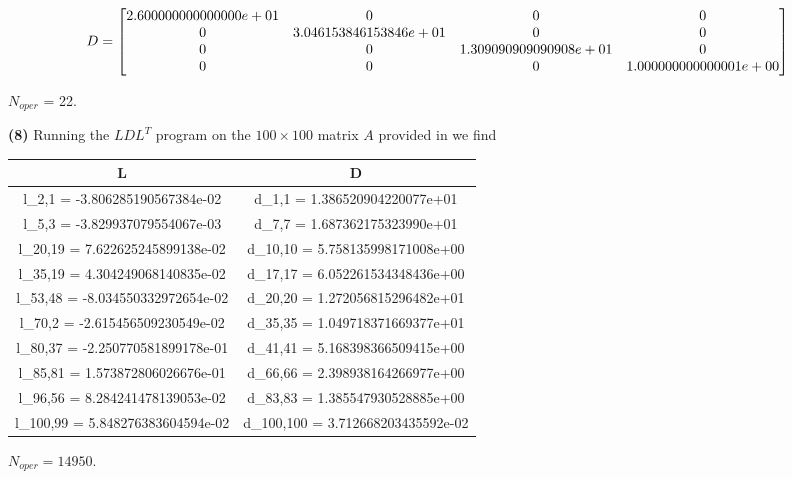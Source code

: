 \documentclass[final,12pt,reqno]{amsart}
\begin{document}
\[
D =
\left[\begin{array}{@{}*{4}{c}@{}}
  2.600000000000000e+01 & 0 & 0 & 0\\
	0 & 3.046153846153846e+01 & 0 & 0\\
	0 & 0 & 1.309090909090908e+01 & 0\\
	0 & 0 & 0 & 1.000000000000001e+00
  \end{array} \right]
\]

$N_{oper}$ = 22.

\newpage

\textbf{(8)} Running the $LDL^T$ program on the $100 \times 100$ matrix $A$ provided in  we find

\begin{center}
	\begin{tabular}{|c|c|}
		\hline
		L & D\\
		\hline
		l_{2,1} = -3.806285190567384e-02 & d_{1,1} = 1.386520904220077e+01\\
		\hline
		l_{5,3} = -3.829937079554067e-03 & d_{7,7} = 1.687362175323990e+01\\
		\hline
		l_{20,19} = 7.622625245899138e-02 & d_{10,10} = 5.758135998171008e+00\\
		\hline
		l_{35,19} = 4.304249068140835e-02 & d_{17,17} = 6.052261534348436e+00\\
		\hline
		l_{53,48} = -8.034550332972654e-02 & d_{20,20} = 1.272056815296482e+01\\
		\hline
		l_{70,2} = -2.615456509230549e-02 & d_{35,35} = 1.049718371669377e+01\\
		\hline
		l_{80,37} = -2.250770581899178e-01 & d_{41,41} = 5.168398366509415e+00\\
		\hline
		l_{85,81} = 1.573872806026676e-01 & d_{66,66} = 2.398938164266977e+00\\
		\hline
		l_{96,56} = 8.284241478139053e-02 & d_{83,83} = 1.385547930528885e+00\\
		\hline
		l_{100,99} = 5.848276383604594e-02 & d_{100,100} = 3.712668203435592e-02\\
		\hline
	\end{tabular}
\end{center}

$N_{oper} = 14950$.
\end{document}
